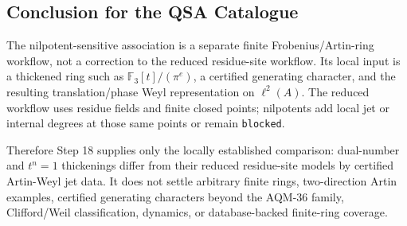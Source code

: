 \subsection{Conclusion for the QSA Catalogue}

The nilpotent-sensitive association is a separate finite Frobenius/Artin-ring
workflow, not a correction to the reduced residue-site workflow.  Its local
input is a thickened ring such as \(\mathbb F_3[t]/(\pi^e)\), a certified
generating character, and the resulting translation/phase Weyl representation
on \(\ell^2(A)\).  The reduced workflow uses residue fields and finite closed
points; nilpotents add local jet or internal degrees at those same points or
remain \texttt{blocked}.

Therefore Step 18 supplies only the locally established comparison:
dual-number and \(t^n=1\) thickenings differ from their reduced residue-site
models by certified Artin-Weyl jet data.  It does not settle arbitrary finite
rings, two-direction Artin examples, certified generating characters beyond
the AQM-36 family, Clifford/Weil classification, dynamics, or database-backed
finite-ring coverage.
